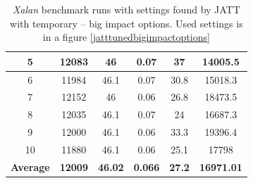 \documentclass[
  digital, %
  oneside,
  notable, %
  nolof,     %
  nolot     %
]{fithesis3}
\begin{document}
\begin{table}[]
\begin{tabular}{|c|c|c|c|c|c|}
		5                & 12083                                                        & 46                                                                     & 0.07                                                                   & 37                                                                   & 14005.5                                                         \\ \hline
		6                & 11984                                                        & 46.1                                                                   & 0.07                                                                   & 30.8                                                                 & 15018.3                                                         \\ \hline
		7                & 12152                                                        & 46                                                                     & 0.06                                                                   & 26.8                                                                 & 18473.5                                                         \\ \hline
		8                & 12035                                                        & 46.1                                                                   & 0.07                                                                   & 24                                                                   & 16687.3                                                         \\ \hline
		9                & 12000                                                        & 46.1                                                                   & 0.06                                                                   & 33.3                                                                 & 19396.4                                                         \\ \hline
		10               & 11880                                                        & 46.1                                                                   & 0.06                                                                   & 25.1                                                                 & 17798                                                           \\ \hline
		\textbf{Average} & \textbf{12009}                                               & \textbf{46.02}                                                         & \textbf{0.066}                                                         & \textbf{27.2}                                                        & \textbf{16971.01}                                               \\ \hline
	\end{tabular}
	\caption{\textit{Xalan} benchmark runs with settings found by JATT with temporary -- big impact options. Used settings is in a figure \ref{jatttunedbigimpactoptions}}
	\label{jattbigimpactresults}
\end{table}
\end{document}
